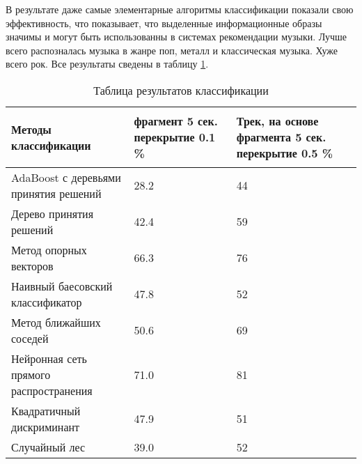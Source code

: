 В результате даже самые элементарные алгоритмы классификации показали свою эффективность, что показывает, что выделенные информационные образы значимы и могут быть использованны в системах рекомендации музыки. Лучше всего распозналась музыка в жанре поп, металл и классическая музыка. Хуже всего рок.  Все результаты сведены в таблицу
\ref{table:result:result}.



\begin{table}[h]
\caption{Таблица результатов классификации}
\label{table:result:result}
  \centering
  \begin{tabular}{| >{\raggedright}m{}
                  | >{\centering}m{}
                  | >{\centering\arraybackslash}m{}|}
    \hline
    {\begin{center}
    Методы классификации
    \end{center} } &  фрагмент 5 сек. перекрытие 0.1 \% &  Трек, на основе фрагмента 5 сек. перекрытие 0.5 \%  \\
    
    \hline
    
    AdaBoost с деревьями принятия решений & \num{28,2} & \num{44}  \\
    
    \hline

    Дерево принятия решений & \num{42,4} & \num{59}  \\

    \hline

    Метод опорных векторов & \num{66,3} & \num{76}   \\

    \hline

    Наивный баесовский классификатор & \num{47,8} & \num{52} \\

    \hline

    Метод ближайших соседей & \num{50,6} & \num{69} \\

    \hline

    Нейронная сеть прямого распространения & \num{71,0} & \num{81} \\

    \hline
    
    Квадратичный дискриминант & \num{47,9} & \num{51} \\

    \hline

    Случайный лес & \num{39,0} & \num{52}  \\

    \hline

  \end{tabular}
\end{table}





